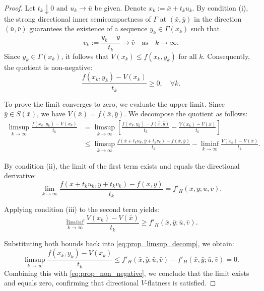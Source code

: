 \documentclass[12pt,twoside,reqno]{amsart}
\theoremstyle{definition}
\numberwithin{equation}{section}
\begin{document}
\begin{proof}
Let $t_k \downarrow 0$ and $u_k \to \bar{u}$ be given. Denote $x_k := \bar{x} + t_k u_k$. 
By condition (i), the strong directional inner semicompactness of $\Gamma$ at $(\bar{x}, \bar{y})$ in the direction $(\bar{u}, \bar{v})$ guarantees the existence of a sequence $y_k \in \Gamma(x_k)$ such that 
\begin{equation*}
    v_k := \frac{y_k - \bar{y}}{t_k} \to \bar{v} \quad \text{as} \quad k \to \infty.
\end{equation*}
Since $y_k \in \Gamma(x_k)$, it follows that $V(x_k) \le f(x_k, y_k)$ for all $k$. Consequently, the quotient is non-negative:
\begin{equation}\label{eq:prop_non_negative}
    \frac{f(x_k, y_k) - V(x_k)}{t_k} \ge 0, \quad \forall k.
\end{equation}

To prove the limit converges to zero, we evaluate the upper limit. Since $\bar{y} \in S(\bar{x})$, we have $V(\bar{x}) = f(\bar{x}, \bar{y})$. We decompose the quotient as follows:
\begin{align}\label{eq:prop_limsup_decomp}
    \limsup_{k \to \infty} \frac{f(x_k, y_k) - V(x_k)}{t_k} 
    &= \limsup_{k \to \infty} \left[ \frac{f(x_k, y_k) - f(\bar{x}, \bar{y})}{t_k} - \frac{V(x_k) - V(\bar{x})}{t_k} \right] \nonumber \\
    &\le \limsup_{k \to \infty} \frac{f(\bar{x} + t_k u_k, \bar{y} + t_k v_k) - f(\bar{x}, \bar{y})}{t_k} - \liminf_{k \to \infty} \frac{V(x_k) - V(\bar{x})}{t_k}.
\end{align}

By condition (ii), the limit of the first term exists and equals the directional derivative:
\begin{equation*}
    \lim_{k \to \infty} \frac{f(\bar{x} + t_k u_k, \bar{y} + t_k v_k) - f(\bar{x}, \bar{y})}{t_k} = f'_H(\bar{x}, \bar{y}; \bar{u}, \bar{v}).
\end{equation*}

Applying condition (iii) to the second term yields:
\begin{equation*}
    \liminf_{k \to \infty} \frac{V(x_k) - V(\bar{x})}{t_k} \ge f'_H(\bar{x}, \bar{y}; \bar{u}, \bar{v}).
\end{equation*}

Substituting both bounds back into \eqref{eq:prop_limsup_decomp}, we obtain:
\begin{equation*}
    \limsup_{k \to \infty} \frac{f(x_k, y_k) - V(x_k)}{t_k} \le f'_H(\bar{x}, \bar{y}; \bar{u}, \bar{v}) - f'_H(\bar{x}, \bar{y}; \bar{u}, \bar{v}) = 0.
\end{equation*}
Combining this with \eqref{eq:prop_non_negative}, we conclude that the limit exists and equals zero, confirming that directional $V$-flatness is satisfied.
\end{proof}
\end{document}
